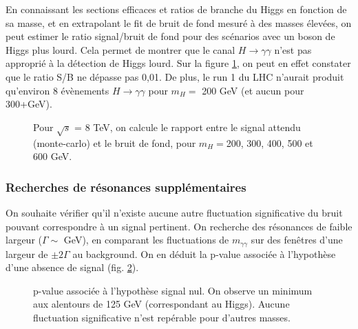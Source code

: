 \documentclass[11pt]{article} %
\begin{document}
En connaissant les sections efficaces et ratios de branche du Higgs en fonction de sa masse, et en extrapolant le fit de bruit de fond mesuré à des masses élevées, on peut estimer le ratio signal/bruit de fond pour des scénarios avec un boson de Higgs plus lourd. Cela permet de montrer que le canal $H \to \gamma \gamma$ n'est pas approprié à la détection de Higgs lourd. Sur la figure  \ref{fig:higgs_lourds_gg}, on peut en effet constater que le ratio S/B ne dépasse pas 0,01. De plus, le run 1 du LHC n'aurait produit qu'environ 8 évènements $H \to \gamma \gamma$ pour $m_H =$ 200 GeV (et aucun pour 300+GeV).
\begin{figure}[H]
\centering
  \caption{\label{fig:higgs_lourds_gg} Pour $\sqrt{s}$ = 8 TeV, on calcule le rapport entre le signal attendu (monte-carlo) et le bruit de fond, pour $m_H =$200, 300, 400, 500 et 600 GeV.  }
 \resizebox{.9\linewidth}{!}{}
\end{figure}

\subsubsection{Recherches de résonances supplémentaires}

On souhaite vérifier qu'il n'existe aucune autre fluctuation significative du bruit pouvant correspondre à un signal pertinent. On recherche des résonances de faible largeur ($\Gamma \sim$ GeV), en comparant les fluctuations de $m_{\gamma\gamma}$ sur des fenêtres d'une largeur de $\pm 2 \Gamma$ au background. On en déduit la p-value associée à l'hypothèse d'une absence de signal (fig. \ref{fig:pvalue}).

\begin{figure}[H]
\centering
  \caption{\label{fig:pvalue}p-value associée à l'hypothèse signal nul. On observe un minimum aux alentours de 125 GeV (correspondant au Higgs). Aucune fluctuation significative n'est repérable pour d'autres masses.  }
 \resizebox{.9\linewidth}{!}{}
\end{figure}




\end{document}
